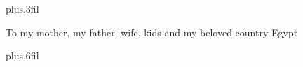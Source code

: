 \documentclass[11pt]{report}
\begin{document}

\vskip0pt plus.3fil
\begin{center}
     To my mother, my father, wife, kids and my beloved country Egypt
\end{center}
\vskip0pt plus.6fil


%
%
%
%
%
%
%
%
%
%
%
%
%
%
%
%
%
%
%
%
%
%
%
%
%
%
%
%
%
%
%
%
%
%
%
%
%
%
%


\end{document}
